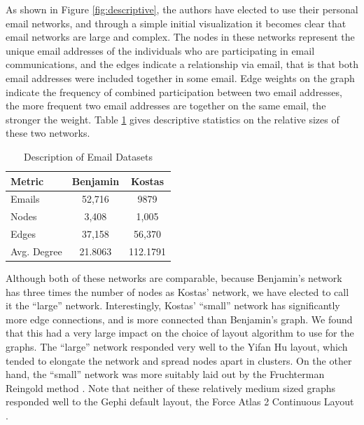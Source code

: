 \documentclass[11pt,letterpaper]{article}
\begin{document}
As shown in Figure \ref{fig:descriptive}, the authors have elected to use their personal email networks, and through a simple initial visualization it becomes clear that email networks are large and complex.  The nodes in these networks represent the unique email addresses of the individuals who are participating in email communications, and the edges indicate a relationship via email, that is that both email addresses were included together in some email. Edge weights on the graph indicate the frequency of combined participation between two email addresses, the more frequent two email addresses are together on the same email, the stronger the weight. Table \ref{tab:network_comparison} gives descriptive statistics on the relative sizes of these two networks.

\begin{table}[t!]
    \centering
    \begin{tabular}{l | c c}
        \hline
        Metric & Benjamin & Kostas \\
        \hline
        Emails & 52,716 & 9879 \\
        Nodes & 3,408 & 1,005 \\
        Edges & 37,158 & 56,370 \\
        Avg. Degree & 21.8063 & 112.1791 \\
        \hline
    \end{tabular}
    \caption{Description of Email Datasets}
    \label{tab:network_comparison}
\end{table}

Although both of these networks are comparable, because Benjamin's network has three times the number of nodes as Kostas' network, we have elected to call it the ``large'' network. Interestingly, Kostas' ``small'' network has significantly more edge connections, and is more connected than Benjamin's graph. We found that this had a very large impact on the choice of layout algorithm to use for the graphs. The ``large'' network responded very well to the Yifan Hu \cite{hu_efficient_2005} layout, which tended to elongate the network and spread nodes apart in clusters. On the other hand, the ``small'' network was more suitably laid out by the Fruchterman Reingold method \cite{fruchterman_graph_1991}. Note that neither of these relatively medium sized graphs responded well to the Gephi default layout, the Force Atlas 2 Continuous Layout \cite{jacomy_forceatlas2_2014}.
\end{document}
